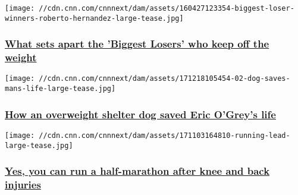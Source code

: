 \href{/2017/11/03/health/biggest-loser-diet-exercise-study/index.html}{}

\texttt{[image: //cdn.cnn.com/cnnnext/dam/assets/160427123354-biggest-loser-winners-roberto-hernandez-large-tease.jpg]}

\hypertarget{what-sets-apart-the-biggest-losers-who-keep-off-the-weight}{%
\subsubsection{\texorpdfstring{\href{/2017/11/03/health/biggest-loser-diet-exercise-study/index.html}{What
sets apart the 'Biggest Losers' who keep off the
weight}}{What sets apart the 'Biggest Losers' who keep off the weight}}\label{what-sets-apart-the-biggest-losers-who-keep-off-the-weight}}

\href{/2017/12/26/health/dog-walking-exercise-saves-life/index.html}{}

\texttt{[image: //cdn.cnn.com/cnnnext/dam/assets/171218105454-02-dog-saves-mans-life-large-tease.jpg]}

\hypertarget{how-an-overweight-shelter-dog-saved-eric-ogreys-life-}{%
\subsubsection{\texorpdfstring{\href{/2017/12/26/health/dog-walking-exercise-saves-life/index.html}{How
an overweight shelter dog saved Eric O'Grey's life
}}{How an overweight shelter dog saved Eric O'Grey's life }}\label{how-an-overweight-shelter-dog-saved-eric-ogreys-life-}}

\href{/2017/11/27/health/marathon-training-injury-exercise-jampolis/index.html}{}

\texttt{[image: //cdn.cnn.com/cnnnext/dam/assets/171103164810-running-lead-large-tease.jpg]}

\hypertarget{yes-you-can-run-a-half-marathon-after-knee-and-back-injuries}{%
\subsubsection{\texorpdfstring{\href{/2017/11/27/health/marathon-training-injury-exercise-jampolis/index.html}{Yes,
you can run a half-marathon after knee and back
injuries}}{Yes, you can run a half-marathon after knee and back injuries}}\label{yes-you-can-run-a-half-marathon-after-knee-and-back-injuries}}

\href{/videos/health/2017/04/03/living-to-100-dr-sanjay-gupta-morning-exercise-workout.cnn}{}

